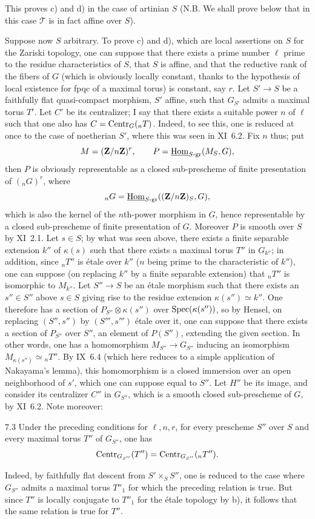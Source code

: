 This proves c) and d) in the case of artinian $S$ (N.B. We shall prove below that in this case $\mathscr T$ is in fact affine over $S$).

Suppose now $S$ arbitrary. To prove c) and d), which are local assertions on $S$ for the Zariski topology, one can suppose that there exists a prime number $\ell$ prime to the residue characteristics of $S$, that $S$ is affine, and that the reductive rank of the fibers of $G$ (which is obviously locally constant, thanks to the hypothesis of local existence for fpqc of a maximal torus) is constant, say $r$. Let $S'\to S$ be a faithfully flat quasi-compact morphism, $S'$ affine, such that $G_{S'}$ admits a maximal torus $T'$. Let $C'$ be its centralizer; I say that there exists a suitable power $n$ of $\ell$ such that one also has $C=\operatorname{Centr}_G({}_nT)$. Indeed, to see this, one is reduced at once to the case of noetherian $S'$, where this was seen in XI~6.2. Fix $n$ thus; put
\[
M=(\mathbf{Z}/n\mathbf{Z})^r,\qquad P=\underline{\operatorname{Hom}}_{S\text{-gr}}(M_S,G),
\]
then $P$ is obviously representable as a closed sub-prescheme of finite presentation of $({}_nG)^r$, where
\[
{}_nG=\underline{\operatorname{Hom}}_{S\text{-gr}}((\mathbf{Z}/n\mathbf{Z})_S,G),
\]
which is also the kernel of the $n$th-power morphism in $G$, hence representable by a closed sub-prescheme of finite presentation of $G$. Moreover $P$ is smooth over $S$ by XI~2.1. Let $s\in S$; by what was seen above, there exists a finite separable extension $k''$ of $\kappa(s)$ such that there exists a maximal torus $T''$ in $G_{k''}$; in addition, since ${}_nT''$ is étale over $k''$ ($n$ being prime to the characteristic of $k''$), one can suppose (on replacing $k''$ by a finite separable extension) that ${}_nT''$ is isomorphic to $M_{k''}$. Let $S''\to S$ be an étale morphism such that there exists an $s''\in S''$ above $s\in S$ giving rise to the residue extension $\kappa(s'')\simeq k''$. One therefore has a section of $P_{S''}\otimes\kappa(s'')$ over $\operatorname{Spec}(\kappa(s''))$, so by Hensel, on replacing $(S'',s'')$ by $(S''',s''')$ étale over it, one can suppose that there exists a section of $P_{S''}$ over $S''$, \ie an element of $P(S'')$, extending the given section. In other words, one has a homomorphism $M_{S''}\to G_{S''}$ inducing an isomorphism $M_{\kappa(s'')}\simeq{}_nT''$. By IX~6.4 (which here reduces to a simple application of Nakayama's lemma), this homomorphism is a closed immersion over an open neighborhood of $s'$, which one can suppose equal to $S''$. Let $H''$ be its image, and consider its centralizer $C''$ in $G_{S''}$, which is a smooth closed sub-prescheme of $G$, by XI~6.2. Note moreover:
\begin{lemma}{7.3}\label{XII.7.3}
Under the preceding conditions for $\ell,n,r$, for every prescheme $S''$ over $S$ and every maximal torus $T''$ of $G_{S''}$, one has
\[
\operatorname{Centr}_{G_{S''}}(T'')=\operatorname{Centr}_{G_{S''}}({}_nT'').
\]
\end{lemma}
Indeed, by faithfully flat descent from $S'\times_S S''$, one is reduced to the case where $G_{S''}$ admits a maximal torus $T''_1$ for which the preceding relation is true. But since $T''$ is locally conjugate to $T''_1$ for the étale topology by b), it follows that the same relation is true for $T''$.


